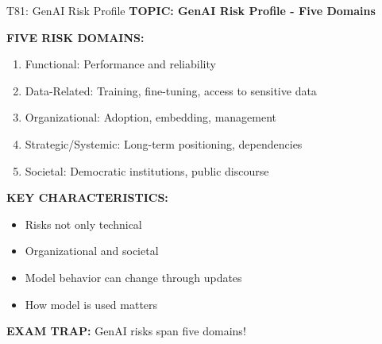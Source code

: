 \documentclass[8pt]{beamer}
\begin{document}
	\begin{frame}{T81: GenAI Risk Profile}
		\fontsize{6.5}{7.5}\selectfont
		\textbf{TOPIC: GenAI Risk Profile - Five Domains}
		
		\vspace{0.1cm}
		\textbf{FIVE RISK DOMAINS:}
		\begin{enumerate}
			\item \textcolor{myblue}{Functional:} Performance and reliability
			\item \textcolor{myblue}{Data-Related:} Training, fine-tuning, access to sensitive data
			\item \textcolor{myblue}{Organizational:} Adoption, embedding, management
			\item \textcolor{myblue}{Strategic/Systemic:} Long-term positioning, dependencies
			\item \textcolor{myblue}{Societal:} Democratic institutions, public discourse
		\end{enumerate}
		
		\vspace{0.1cm}
		\textbf{KEY CHARACTERISTICS:}
		\begin{itemize}
			\item Risks not only technical
			\item Organizational and societal
			\item Model behavior can change through updates
			\item How model is used matters
		\end{itemize}
		
		\textcolor{myred}{\textbf{EXAM TRAP:}} GenAI risks span \textcolor{myblue}{five domains}!
	\end{frame}
	
\end{document}
